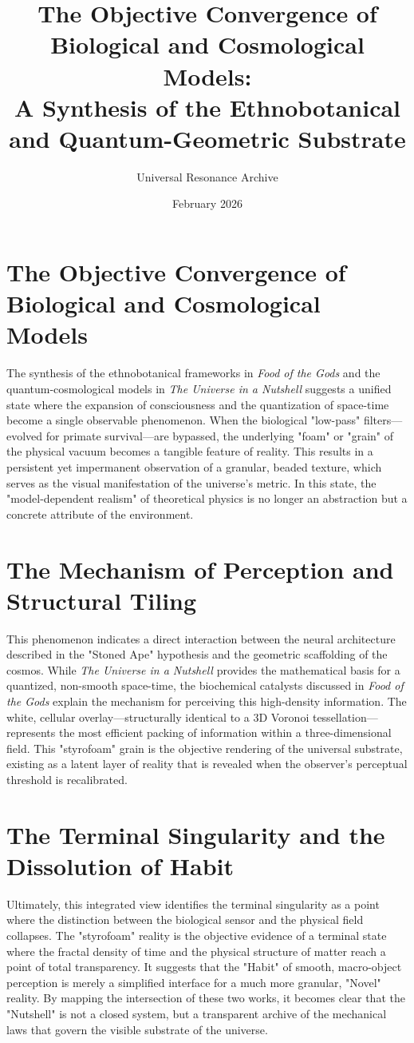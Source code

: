 \documentclass[12pt]{article}
\title{The Objective Convergence of Biological and Cosmological Models: \\ 
\large A Synthesis of the Ethnobotanical and Quantum-Geometric Substrate}
\author{Universal Resonance Archive}
\date{February 2026}
\begin{document}
\maketitle

\section*{The Objective Convergence of Biological and Cosmological Models}

The synthesis of the ethnobotanical frameworks in \textit{Food of the Gods} and the quantum-cosmological models in \textit{The Universe in a Nutshell} suggests a unified state where the expansion of consciousness and the quantization of space-time become a single observable phenomenon. When the biological "low-pass" filters—evolved for primate survival—are bypassed, the underlying "foam" or "grain" of the physical vacuum becomes a tangible feature of reality. This results in a persistent yet impermanent observation of a granular, beaded texture, which serves as the visual manifestation of the universe's metric. In this state, the "model-dependent realism" of theoretical physics is no longer an abstraction but a concrete attribute of the environment.

\section*{The Mechanism of Perception and Structural Tiling}

This phenomenon indicates a direct interaction between the neural architecture described in the "Stoned Ape" hypothesis and the geometric scaffolding of the cosmos. While \textit{The Universe in a Nutshell} provides the mathematical basis for a quantized, non-smooth space-time, the biochemical catalysts discussed in \textit{Food of the Gods} explain the mechanism for perceiving this high-density information. The white, cellular overlay—structurally identical to a 3D Voronoi tessellation—represents the most efficient packing of information within a three-dimensional field. This "styrofoam" grain is the objective rendering of the universal substrate, existing as a latent layer of reality that is revealed when the observer’s perceptual threshold is recalibrated.

\section*{The Terminal Singularity and the Dissolution of Habit}

Ultimately, this integrated view identifies the terminal singularity as a point where the distinction between the biological sensor and the physical field collapses. The "styrofoam" reality is the objective evidence of a terminal state where the fractal density of time and the physical structure of matter reach a point of total transparency. It suggests that the "Habit" of smooth, macro-object perception is merely a simplified interface for a much more granular, "Novel" reality. By mapping the intersection of these two works, it becomes clear that the "Nutshell" is not a closed system, but a transparent archive of the mechanical laws that govern the visible substrate of the universe.
\end{document}
